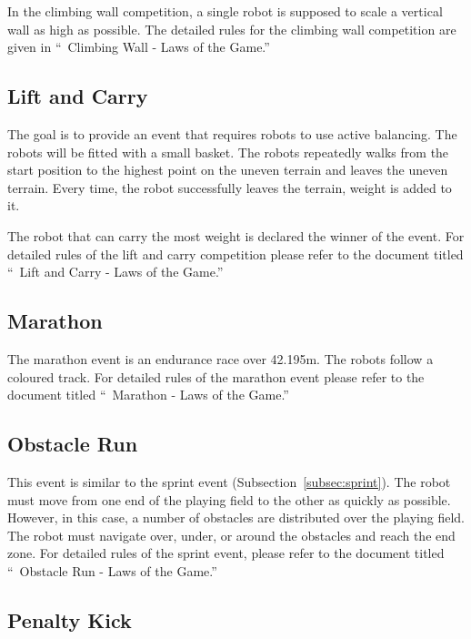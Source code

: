 \documentclass[12pt]{hurocup}
\begin{document}
In the climbing wall competition, a single robot is supposed to scale
a vertical wall as high as possible. The detailed rules for the
climbing wall competition are given in ``\HuroCup\ Climbing Wall - Laws
of the Game.''

\subsection{Lift and Carry}
\label{subsec:lift-and-carry}

The goal is to provide an event that requires robots to use active
balancing. The robots will be fitted with a small basket. The robots
repeatedly walks from the start position to the highest point on the
uneven terrain and leaves the uneven terrain. Every time, the robot
successfully leaves the terrain, weight is added to it.

The robot that can carry the most weight is declared the winner of the
event. For detailed rules of the lift and carry competition please
refer to the document titled ``\HuroCup\ Lift and Carry - Laws of the
Game.''

\subsection{Marathon}
\label{subsec:marathon}

The marathon event is an endurance race over 42.195m. The robots
follow a coloured track. For detailed rules of the marathon event
please refer to the document titled ``\HuroCup\ Marathon - Laws of the
Game.''

\subsection{Obstacle Run}
\label{subsec:obstacle-run} 

This event is similar to the sprint event
(Subsection~\ref{subsec:sprint}). The robot must move from one end of
the playing field to the other as quickly as possible. However, in
this case, a number of obstacles are distributed over the playing
field. The robot must navigate over, under, or around the obstacles
and reach the end zone. For detailed rules of the sprint event, please
refer to the document titled ``\HuroCup\ Obstacle Run - Laws of the
Game.''

\subsection{Penalty Kick}
\label{subsec:penalty-kick}
\end{document}
